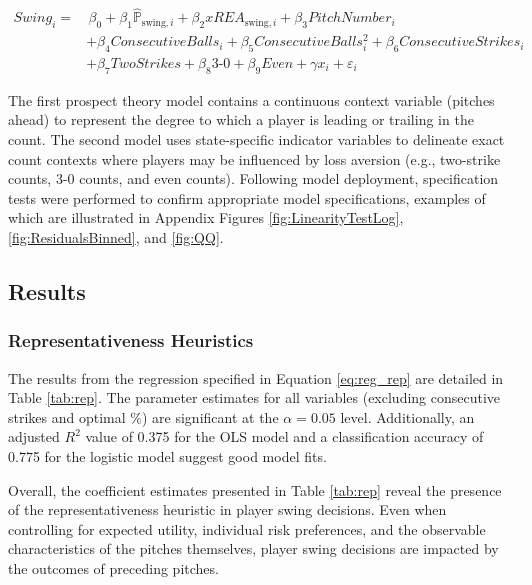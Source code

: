 \documentclass[12pt]{article}
\numberwithin{equation}{section}
\begin{document}
\begin{align}
Swing_i = & \, \beta_0 + \beta_1 \hat{\mathbb{P}}_{\text{swing}, i} + \beta_2 {xREA}_{\text{swing}, i} + \beta_3 PitchNumber_i \nonumber \\
          & + \beta_4 ConsecutiveBalls_i + \beta_5 ConsecutiveBalls_i^2 + \beta_6 ConsecutiveStrikes_i \nonumber \\
          & + \beta_7TwoStrikes + \beta_8\text{3-0} + \beta_9Even + \gamma x_i + \varepsilon_i
\label{eq:reg_pt2}
\end{align}

\vspace{5mm} %

The first prospect theory model contains a continuous context variable (pitches ahead) to represent the degree to which a player is leading or trailing in the count. The second model uses state-specific indicator variables to delineate exact count contexts where players may be influenced by loss aversion (e.g., two-strike counts, 3-0 counts, and even counts). Following model deployment, specification tests were performed to confirm appropriate model specifications, examples of which are illustrated in Appendix Figures \ref{fig:LinearityTestLog}, \ref{fig:ResidualsBinned}, and \ref{fig:QQ}.


\subsection{Results}

\subsubsection{Representativeness Heuristics}

The results from the regression specified in Equation \ref{eq:reg_rep} are detailed in Table \ref{tab:rep}. The parameter estimates for all variables (excluding consecutive strikes and optimal $\%$) are significant at the $\alpha = 0.05$ level. Additionally, an adjusted $R^2$ value of 0.375 for the OLS model and a classification accuracy of 0.775 for the logistic model suggest good model fits.

\vspace{5mm} %

Overall, the coefficient estimates presented in Table \ref{tab:rep} reveal the presence of the representativeness heuristic in player swing decisions. Even when controlling for expected utility, individual risk preferences, and the observable characteristics of the pitches themselves, player swing decisions are impacted by the outcomes of preceding pitches. 
\end{document}
